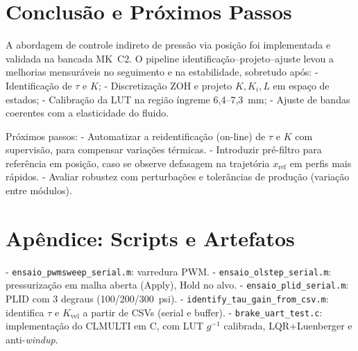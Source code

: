 \section{Conclusão e Próximos Passos}
A abordagem de controle indireto de pressão via posição foi implementada e validada na bancada MK~C2. O pipeline identificação–projeto–ajuste levou a melhorias mensuráveis no seguimento e na estabilidade, sobretudo após:
- Identificação de $\tau$ e $K$;
- Discretização ZOH e projeto $K, K_i, L$ em espaço de estados;
- Calibração da LUT na região íngreme 6{,}4–7{,}3~mm;
- Ajuste de bandas coerentes com a elasticidade do fluido.

Próximos passos:
- Automatizar a reidentificação (on-line) de $\tau$ e $K$ com supervisão, para compensar variações térmicas.
- Introduzir pré-filtro para referência em posição, caso se observe defasagem na trajetória $x_{\text{ref}}$ em perfis mais rápidos.
- Avaliar robustez com perturbações e tolerâncias de produção (variação entre módulos).

\appendix
\section*{Apêndice: Scripts e Artefatos}
- \texttt{ensaio\_pwmsweep\_serial.m}: varredura PWM.
- \texttt{ensaio\_olstep\_serial.m}: pressurização em malha aberta (Apply), Hold no alvo.
- \texttt{ensaio\_plid\_serial.m}: PLID com 3 degraus (100/200/300~psi).
- \texttt{identify\_tau\_gain\_from\_csv.m}: identifica $\tau$ e $K_{\text{vel}}$ a partir de CSVs (serial e buffer).
- \texttt{brake\_uart\_test.c}: implementação do CLMULTI em C, com LUT $g^{-1}$ calibrada, LQR+Luenberger e anti-\emph{windup}.
















